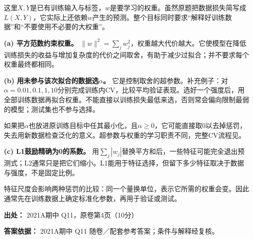 这里\(X,Y\)是已有训练输入与标签，\(w\)是要学习的权重。虽然原题把数据损失简写成\(L(X,Y)\)，它实际上还依赖\(w\)产生的预测。整个目标同时要求“解释好训练数据”和“不要使用不必要的大权重”。


\textbf{(a) 平方范数约束权重。} \(\|w\|^2=\sum_jw_j^2\)，权重越大代价越大。它使模型在降低训练损失的收益与增加复杂度的代价之间取舍，有助于减少过拟合；并不要求每个权重最终都相同。


\textbf{(b) 用未参与该次拟合的数据选\(\alpha\)。} 它是控制取舍的超参数。补充例子：对\(\alpha=0.01,0.1,1,10\)分别完成训练内CV，比较平均验证表现。选好一个强度后，用全部训练数据再拟合权重。不能直接以训练损失最低来选，否则常会偏向限制最弱的模型；测试集也不参与选择。


如果把\(\alpha\)也放进原训练目标中任其最小化，且\(\alpha\ge0\)，它可能直接取0以去掉惩罚，失去用新数据检查泛化的意义。超参数与权重的学习职责不同，完整CV流程见。


\textbf{(c) L1鼓励精确为0的系数。} 用\(\sum_j|w_j|\)替换平方和后，一些特征可能完全退出预测式；L2通常只是把它们缩小。L1能用于特征选择，但留下多少特征取决于数据与强度，不是固定比例。


特征尺度会影响两种惩罚的比较：同一个量换单位，表示它所需的权重会变。因此通常先在训练数据上确定标准化参数，再用于验证或测试。


\textbf{出处：} 2021A期中 Q11，原卷第4页（10分）


\textbf{答案依据：} 2021A期中 Q11 随卷／配套参考答案；条件与解释经复核。

